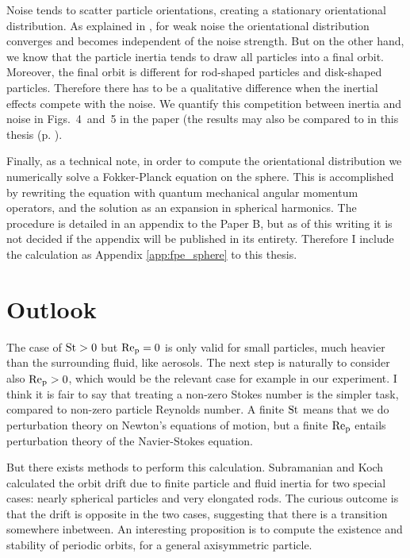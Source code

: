 \documentclass[thesis.tex]{subfiles}
\begin{document}
Noise tends to scatter particle orientations, creating a stationary orientational distribution. As explained in , for weak noise the orientational distribution converges and becomes independent of the noise strength. But on the other hand, we know that the particle inertia tends to draw all particles into a final orbit. Moreover, the final orbit is different for rod-shaped particles and disk-shaped particles. Therefore there has to be a qualitative difference when the inertial effects compete with the noise. We quantify this competition between inertia and noise in Figs.~4~and~5 in the paper (the results may also be compared to  in this thesis (p. \pageref{fig:sintheta1}).

Finally, as a technical note, in order to compute the orientational distribution we numerically solve a Fokker-Planck equation on the sphere. This is accomplished by rewriting the equation with quantum mechanical angular momentum operators, and the solution as an expansion in spherical harmonics. The procedure is detailed in an appendix to the Paper B, but as of this writing it is not decided if the appendix will be published in its entirety. Therefore I include the calculation as Appendix \ref{app:fpe_sphere} to this thesis.

\section{Outlook}

The case of $\mbox{St}>0$ but $\mbox{Re}_{\mathrm p}=0$ is only valid for small particles, much heavier than the surrounding fluid, like aerosols. The next step is naturally to consider also $\mbox{Re}_{\mathrm p} > 0$, which would be the relevant case for example in our experiment. I think it is fair to say that treating a non-zero Stokes number is the simpler task, compared to non-zero particle Reynolds number. A finite $\mbox{St}$ means that we do perturbation theory on Newton's equations of motion, but a finite $\mbox{Re}_{\mathrm p}$ entails perturbation theory of the Navier-Stokes equation.

But there exists methods to perform this calculation. Subramanian and Koch \cite{subramanian2005,subramanian2006} calculated the orbit drift due to finite particle and fluid inertia for two special cases: nearly spherical particles and very elongated rods. The curious outcome is that the drift is opposite in the two cases, suggesting that there is a transition somewhere inbetween. An interesting proposition is to compute the existence and stability of periodic orbits, for a general axisymmetric particle. 
\end{document}
